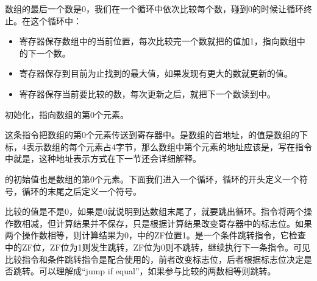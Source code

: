 数组的最后一个数是0，我们在一个循环中依次比较每个数，碰到0的时候让循环终止。在这个循环中：


\begin{itemize}

\item {}寄存器保存数组中的当前位置，每次比较完一个数就把的值加1，指向数组中的下一个数。

\item {}寄存器保存到目前为止找到的最大值，如果发现有更大的数就更新的值。

\item {}寄存器保存当前要比较的数，每次更新之后，就把下一个数读到中。
\end{itemize}



初始化，指向数组的第0个元素。




这条指令把数组的第0个元素传送到寄存器中。是数组的首地址，的值是数组的下标，4表示数组的每个元素占4字节，那么数组中第个元素的地址应该是，写在指令中就是，这种地址表示方式在下一节还会详细解释。




的初始值也是数组的第0个元素。下面我们进入一个循环，循环的开头定义一个符号，循环的末尾之后定义一个符号。




比较的值是不是0，如果是0就说明到达数组末尾了，就要跳出循环。指令将两个操作数相减，但计算结果并不保存，只是根据计算结果改变寄存器中的标志位。如果两个操作数相等，则计算结果为0，中的ZF位置1。是一个条件跳转指令，它检查中的ZF位，ZF位为1则发生跳转，ZF位为0则不跳转，继续执行下一条指令。可见比较指令和条件跳转指令是配合使用的，前者改变标志位，后者根据标志位决定是否跳转。可以理解成“jump if equal”，如果参与比较的两数相等则跳转。




